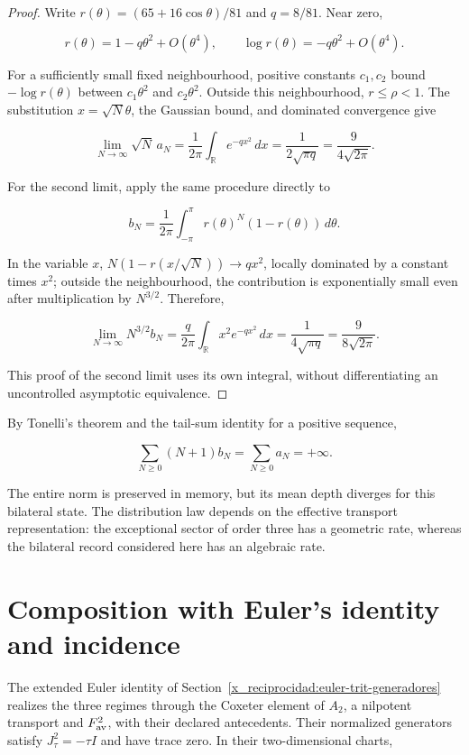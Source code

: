 \begin{proof}
Write \(r(\theta)=(65+16\cos\theta)/81\) and \(q=8/81\). Near zero,

\[
r(\theta)=1-q\theta^2+O(\theta^4),\qquad
\log r(\theta)=-q\theta^2+O(\theta^4).
\]

For a sufficiently small fixed neighbourhood, positive constants \(c_1,c_2\) bound \(-\log r(\theta)\) between \(c_1\theta^2\) and \(c_2\theta^2\). Outside this neighbourhood, \(r\leq\rho<1\). The substitution \(x=\sqrt N\theta\), the Gaussian bound, and dominated convergence give

\[
\lim_{N\to\infty}\sqrt N\,a_N
=\frac1{2\pi}\int_{\mathbb R}e^{-qx^2}\,dx
=\frac1{2\sqrt{\pi q}}=\frac9{4\sqrt{2\pi}}.
\]

For the second limit, apply the same procedure directly to

\[
b_N=\frac1{2\pi}\int_{-\pi}^{\pi}r(\theta)^N(1-r(\theta))\,d\theta.
\]

In the variable \(x\), \(N(1-r(x/\sqrt N))\to qx^2\), locally dominated by a constant times \(x^2\); outside the neighbourhood, the contribution is exponentially small even after multiplication by \(N^{3/2}\). Therefore,

\[
\lim_{N\to\infty}N^{3/2}b_N
=\frac q{2\pi}\int_{\mathbb R}x^2e^{-qx^2}\,dx
=\frac1{4\sqrt{\pi q}}=\frac9{8\sqrt{2\pi}}.
\]

This proof of the second limit uses its own integral, without differentiating an uncontrolled asymptotic equivalence.
\end{proof}

By Tonelli's theorem and the tail-sum identity for a positive sequence,

\begin{equation}
\sum_{N\geq0}(N+1)b_N=\sum_{N\geq0}a_N=+\infty.
\label{x_reciprocidad:nuc03:eq:21}
\end{equation}

The entire norm is preserved in memory, but its mean depth diverges for this bilateral state. The distribution law depends on the effective transport representation: the exceptional sector of order three has a geometric rate, whereas the bilateral record considered here has an algebraic rate.

\section{Composition with Euler's identity and incidence}

The extended Euler identity of Section~\ref{x_reciprocidad:euler-trit-generadores} realizes the three regimes through the Coxeter element of \(A_2\), a nilpotent transport and \(F_{\rm av}^2\), with their declared antecedents. Their normalized generators satisfy \(J_\tau^2=-\tau I\) and have trace zero. In their two-dimensional charts,

